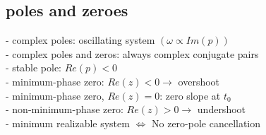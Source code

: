 \subsection{poles and zeroes}
- complex poles: oscillating system $(\omega \propto Im(p))$\\
- complex poles and zeros: always complex conjugate pairs\\
- stable pole: $Re(p) < 0$\\
- minimum-phase zero: $Re(z) < 0 \rightarrow$ overshoot\\
- minimum-phase zero, $Re(z) = 0$: zero slope at $t_0$\\
- non-minimum-phase zero: $Re(z) > 0 \rightarrow$ undershoot\\
- minimum realizable system $\Leftrightarrow$ No zero-pole cancellation
